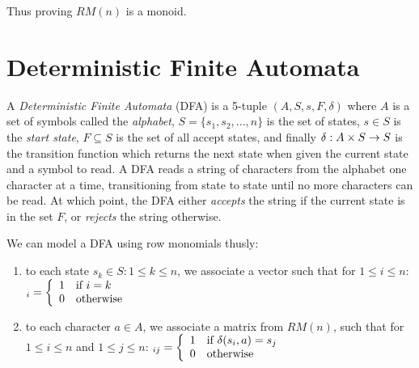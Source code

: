 Thus proving $RM(n)$ is a monoid.

\section{Deterministic Finite Automata}

A \emph{Deterministic Finite Automata} (DFA) is a 5-tuple
$(A,S,s,F,\delta)$ where $A$ is a set of symbols called the
\emph{alphabet}, $S = \{ s_1, s_2, ..., n \} $ is the set of states,
$s \in S$ is the \emph{start state}, $F \subseteq S$ is the set of all
accept states, and finally $\delta: A \times S \rightarrow S$ is the
transition function which returns the next state when given the
current state and a symbol to read.  A DFA reads a string of
characters from the alphabet one character at a time, transitioning
from state to state until no more characters can be read.  At which
point, the DFA either \emph{accepts} the string if the current state
is in the set $F$, or \emph{rejects} the string otherwise.

We can model a DFA using row monomials thusly:

\begin{enumerate}
\item to each state $s_k \in S : 1 \leq k \leq n$, we associate a vector
  such that for $1 \leq i \leq n$:
  \begin{math}
    [s]_i = \left\{
      \begin{array}{l l}
        1 & \text{if } i = k \\
        0 & \text{otherwise}
      \end{array} \right.
  \end{math}

\item to each character $a \in A$, we associate a matrix from $RM(n)$,
  such that for $1 \leq i \leq n$ and $1 \leq j \leq n$:
  \begin{math}
    [a]_{ij} = \left\{
      \begin{array}{l l}
        1 & \text{if } \delta(s_i,a) = s_j \\
        0 & \text{otherwise}
      \end{array} \right.
  \end{math}
\end{enumerate}